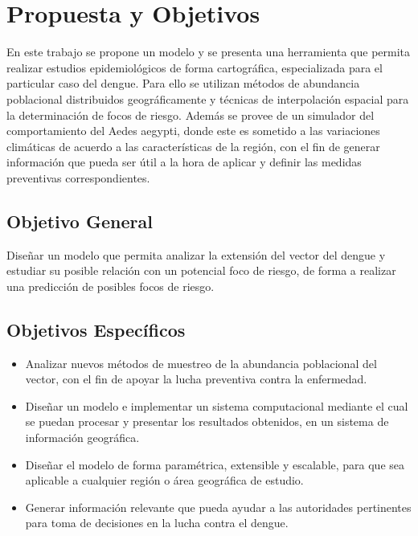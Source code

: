 \section{Propuesta y Objetivos}
En este trabajo se propone un modelo y se presenta una herramienta que permita realizar estudios
epidemiológicos de forma cartográfica, especializada para el particular caso del dengue. Para ello
se utilizan métodos de abundancia poblacional distribuidos geográficamente y técnicas de
interpolación espacial para la determinación de focos de riesgo. Además se provee de un simulador
del comportamiento del Aedes aegypti, donde este es sometido a las variaciones climáticas de
acuerdo a las características de la región, con el fin de generar información que pueda ser útil a
la hora de aplicar y definir las medidas preventivas correspondientes.

\subsection{Objetivo General}
Diseñar un modelo que permita analizar la extensión del vector del dengue y estudiar su posible
relación con un potencial foco de riesgo, de forma a realizar una predicción de posibles focos de
riesgo.

\subsection{Objetivos Específicos}

\begin{itemize}

\item Analizar nuevos métodos de muestreo de la abundancia poblacional del vector, con el fin de apoyar la lucha preventiva contra la enfermedad.

\item Diseñar un modelo e implementar un sistema computacional mediante el cual se puedan procesar y presentar los resultados obtenidos, en un sistema de información geográfica.

\item Diseñar el modelo de forma paramétrica, extensible y escalable, para que sea aplicable a cualquier región o área geográfica de estudio.

\item Generar información relevante que pueda ayudar a las autoridades pertinentes para toma de decisiones en la lucha contra el dengue.

\end{itemize}

